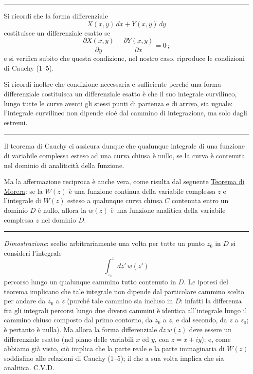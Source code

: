 \documentclass[11pt, a4paper]{book}
\numberwithin{equation}{section}
\begin{document}
\medskip\hrule\medskip

Si ricordi che la forma differenziale
\[
X(x,y)\, dx + Y(x,y)\, dy
\]
costituisce un differenziale esatto se
\[
\frac{\partial X(x,y)}{\partial y} + \frac{\partial Y(x,y)}{\partial x} = 0\,;
\]
e si verifica subito che questa condizione, nel nostro caso, riproduce le condizioni di Cauchy (1--5).

Si ricordi inoltre che condizione necessaria e sufficiente perché una forma differenziale costituisca un differenziale esatto è che il suo integrale curvilineo, lungo tutte le curve aventi gli stessi punti di partenza e di arrivo, sia uguale: l'integrale curvilineo non dipende cioè dal cammino di integrazione, ma solo dagli estremi.

\medskip\hrule\medskip

Il teorema di Cauchy ci assicura dunque che qualunque integrale di una funzione di variabile complessa esteso ad una curva chiusa è nullo, se la curva è contenuta nel dominio di analiticità della funzione.

Ma la affermazione reciproca è anche vera, come risulta dal seguente \underline{Teorema di Morera}: se la $W(z)$ è una funzione continua della variabile complessa $z$ e l'integrale di $W(z)$ esteso a qualunque curva chiusa $C$ contenuta entro un dominio $D$ è nullo, allora la $w(z)$ è una funzione analitica della variabile complessa $z$ nel dominio $D$.

\medskip\hrule\medskip

\textit{Dimostrazione}: scelto arbitrariamente una volta per tutte un punto $z_0$ in $D$ si consideri l'integrale
\[
\int_{z_0}^{z} dz'\, w(z')
\]
percorso lungo un qualunque cammino tutto contenuto in $D$. Le ipotesi del teorema implicano che tale integrale non dipende dal particolare cammino scelto per andare da $z_0$ a $z$ (purché tale cammino sia incluso in $D$: infatti la differenza fra gli integrali percorsi lungo due diversi cammini è identica all'integrale lungo il cammino chiuso composto dal primo contorno, da $z_0$ a $z$, e dal secondo, da $z$ a $z_0$; è pertanto è nulla). Ma allora la forma differenziale $dz\, w(z)$ deve essere un differenziale esatto (nel piano delle variabili $x$ ed $y$, con $z = x + iy$); e, come abbiamo già visto, ciò implica che la parte reale e la parte immaginaria di $W(z)$ soddisfino alle relazioni di Cauchy (1--5); il che a sua volta implica che sia analitica. C.V.D.

\medskip
\end{document}
